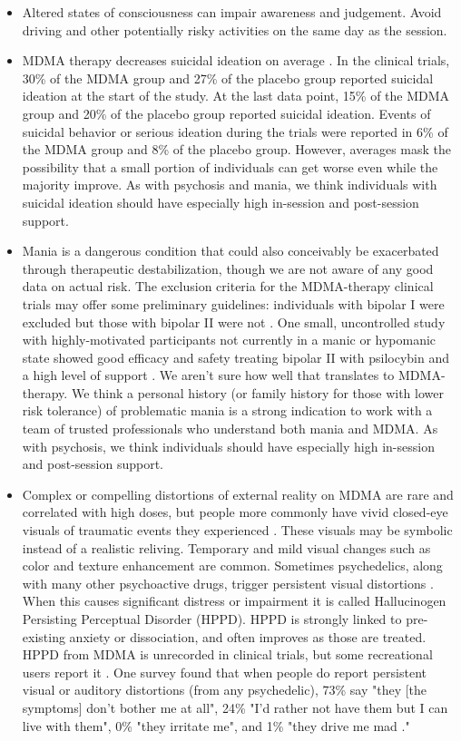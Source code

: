 \documentclass[12pt,letterpaper]{book}
\begin{document}
\begin{itemize}
    \item Altered states of consciousness can impair awareness and judgement. Avoid driving and other potentially risky activities on the same day as the session.
    \item MDMA therapy decreases suicidal ideation on average \cite{mitchellMDMAClinicalTrial,mitchellMDMAClinicalTrial2}. In the clinical trials, 30\% of the MDMA group and 27\% of the placebo group reported suicidal ideation at the start of the study. At the last data point, 15\% of the MDMA group and 20\% of the placebo group reported suicidal ideation. Events of suicidal behavior or serious ideation during the trials were reported in 6\% of the MDMA group and 8\% of the placebo group. However, averages mask the possibility that a small portion of individuals can get worse even while the majority improve. As with psychosis and mania, we think individuals with suicidal ideation should have especially high in-session and post-session support. 
    \item Mania is a dangerous condition that could also conceivably be exacerbated through therapeutic destabilization, though we are not aware of any good data on actual risk. The exclusion criteria for the MDMA-therapy clinical trials may offer some preliminary guidelines: individuals with bipolar I were excluded but those with bipolar II were not \cite{mitchellMDMAClinicalTrial2}. One small, uncontrolled study with highly-motivated participants not currently in a manic or hypomanic state showed good efficacy and safety treating bipolar II with psilocybin and a high level of support \cite{aaronsonBipolarII}. We aren't sure how well that translates to MDMA-therapy. We think a personal history (or family history for those with lower risk tolerance) of problematic mania is a strong indication to work with a team of trusted professionals who understand both mania and MDMA. As with psychosis, we think individuals should have especially high in-session and post-session support.
    \item Complex or compelling distortions of external reality on MDMA are rare and correlated with high doses, but people more commonly have vivid closed-eye visuals of traumatic events they experienced \cite{liechtiGender}. These visuals may be symbolic instead of a realistic reliving. Temporary and mild visual changes such as color and texture enhancement are common. Sometimes psychedelics, along with many other psychoactive drugs, trigger persistent visual distortions \cite{alexanderHPPD,halpernHPPD}. When this causes significant distress or impairment it is called Hallucinogen Persisting Perceptual Disorder (HPPD). HPPD is strongly linked to pre-existing anxiety or dissociation, and often improves as those are treated. HPPD from MDMA is unrecorded in clinical trials, but some recreational users report it \cite{vizeliActuteEffects,litjensHPPD}. One survey found that when people do report persistent visual or auditory distortions (from any psychedelic), 73\% say "they [the symptoms] don't bother me at all", 24\% "I'd rather not have them but I can live with them", 0\% "they irritate me", and 1\% "they drive me mad \cite{carhart2010user}."
\end{itemize}
\end{document}
